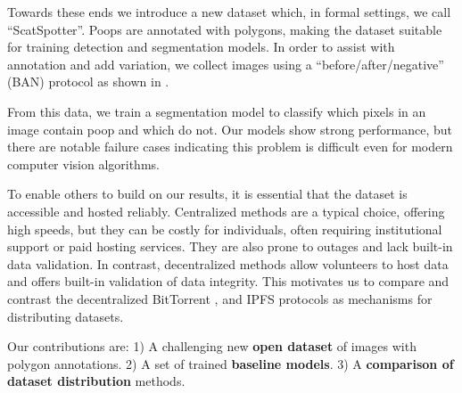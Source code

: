 Towards these ends we introduce a new dataset which, 
in formal settings, we call ``ScatSpotter''.
Poops are annotated with polygons, making the dataset suitable for training detection and segmentation
  models.
In order to assist with annotation and add variation, we collect images using a ``before/after/negative'' (BAN)
  protocol as shown in .

From this data, we train a segmentation model to classify which pixels in an image contain poop and which do
  not.
Our models show strong performance, but there are notable failure cases indicating this problem is difficult
  even for modern computer vision algorithms. 

To enable others to build on our results, it is essential that the dataset is accessible and hosted
  reliably.
Centralized methods are a typical choice, offering high speeds, but they can be costly for individuals,
  often requiring institutional support or paid hosting services.
They are also prone to outages and lack built-in data validation.
In contrast, decentralized methods allow volunteers to host data and offers built-in validation of data
  integrity.
This motivates us to compare and contrast the decentralized BitTorrent \cite{cohen_incentives_2003}, and
  IPFS \cite{benet_ipfs_2014} protocols as mechanisms for distributing datasets.


Our contributions are:
1) A challenging new \textbf{open dataset} of images with polygon annotations.
2) A set of trained \textbf{baseline models}.
3) A \textbf{comparison of dataset distribution} methods.

